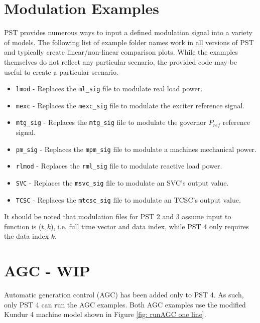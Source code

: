 \section{Modulation Examples} \label{sec: modExamples}
PST provides numerous ways to input a defined modulation signal into a variety of models.
The following list of example folder names work in all versions of PST and typically create linear/non-linear comparison plots.
While the examples themselves do not reflect any particular scenario, the provided code may be useful to create a particular scenario.

\begin{itemize}
\item \verb|lmod| - Replaces the \verb|ml_sig| file to modulate real load power.
\item \verb|mexc| - Replaces the \verb|mexc_sig| file to modulate the exciter reference signal.
\item \verb|mtg_sig| - Replaces the \verb|mtg_sig| file to modulate the governor $P_{ref}$ reference signal.
\item \verb|pm_sig| - Replaces the \verb|mpm_sig| file to modulate a machines mechanical power.
\item \verb|rlmod| - Replaces the \verb|rml_sig| file to modulate reactive load power.
\item \verb|SVC| - Replaces the \verb|msvc_sig| file to modulate an SVC's output value.
\item \verb|TCSC| - Replaces the \verb|mtcsc_sig| file to modulate an TCSC's output value.
\end{itemize}

\noindent It should be noted that modulation files for PST 2 and 3 assume input to function is ($t, k$), i.e. full time vector and data index, while PST 4 only requires the data index $k$.


\pagebreak
\section{AGC - WIP}
Automatic generation control (AGC) has been added only to PST 4.
As such, only PST 4 can run the AGC examples.
Both AGC examples use the modified Kundur 4 machine model shown in Figure \ref{fig: runAGC one line}.

